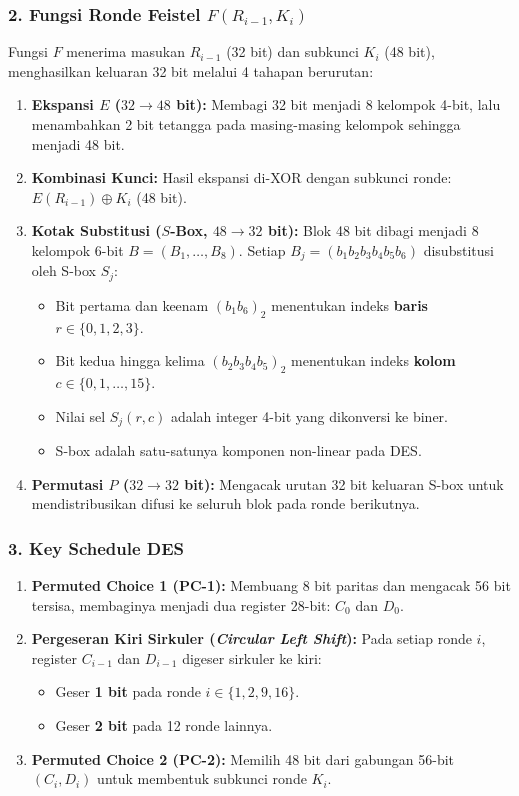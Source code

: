\documentclass[11pt,a4paper]{article}
\begin{document}
\subsubsection{2. Fungsi Ronde Feistel $F(R_{i-1}, K_i)$}
Fungsi $F$ menerima masukan $R_{i-1}$ (32 bit) dan subkunci $K_i$ (48 bit), menghasilkan keluaran 32 bit melalui 4 tahapan berurutan:
\begin{enumerate}[leftmargin=*]
    \item \textbf{Ekspansi $E$ ($32 \to 48$ bit):} Membagi 32 bit menjadi 8 kelompok 4-bit, lalu menambahkan 2 bit tetangga pada masing-masing kelompok sehingga menjadi 48 bit.
    \item \textbf{Kombinasi Kunci:} Hasil ekspansi di-XOR dengan subkunci ronde: $E(R_{i-1}) \oplus K_i$ (48 bit).
    \item \textbf{Kotak Substitusi ($S$-Box, $48 \to 32$ bit):} Blok 48 bit dibagi menjadi 8 kelompok 6-bit $B = (B_1, \dots, B_8)$. Setiap $B_j = (b_1 b_2 b_3 b_4 b_5 b_6)$ disubstitusi oleh S-box $S_j$:
    \begin{itemize}
        \item Bit pertama dan keenam $(b_1 b_6)_2$ menentukan indeks \textbf{baris} $r \in \{0, 1, 2, 3\}$.
        \item Bit kedua hingga kelima $(b_2 b_3 b_4 b_5)_2$ menentukan indeks \textbf{kolom} $c \in \{0, 1, \dots, 15\}$.
        \item Nilai sel $S_j(r, c)$ adalah integer 4-bit yang dikonversi ke biner.
        \item S-box adalah satu-satunya komponen non-linear pada DES.
    \end{itemize}
    \item \textbf{Permutasi $P$ ($32 \to 32$ bit):} Mengacak urutan 32 bit keluaran S-box untuk mendistribusikan difusi ke seluruh blok pada ronde berikutnya.
\end{enumerate}

\subsubsection{3. Key Schedule DES}
\begin{enumerate}[leftmargin=*]
    \item \textbf{Permuted Choice 1 (PC-1):} Membuang 8 bit paritas dan mengacak 56 bit tersisa, membaginya menjadi dua register 28-bit: $C_0$ dan $D_0$.
    \item \textbf{Pergeseran Kiri Sirkuler (\textit{Circular Left Shift}):} Pada setiap ronde $i$, register $C_{i-1}$ dan $D_{i-1}$ digeser sirkuler ke kiri:
    \begin{itemize}
        \item Geser \textbf{1 bit} pada ronde $i \in \{1, 2, 9, 16\}$.
        \item Geser \textbf{2 bit} pada 12 ronde lainnya.
    \end{itemize}
    \item \textbf{Permuted Choice 2 (PC-2):} Memilih 48 bit dari gabungan 56-bit $(C_i, D_i)$ untuk membentuk subkunci ronde $K_i$.
\end{enumerate}
\end{document}
